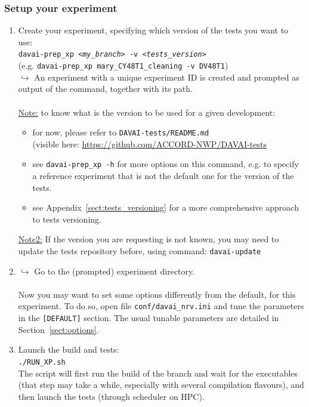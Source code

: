 \documentclass[a4paper,10pt,twoside]{article}
\begin{document}
\subsubsection{Setup your experiment}
\begin{enumerate}[label=(\alph*)]
 \item Create your experiment, specifying which version of the tests you want to use:\\
 \texttt{davai-prep\_xp \textit{<my\_branch>} -v \textit{<tests\_version>}}\\
 (e.g. \texttt{davai-prep\_xp mary\_CY48T1\_cleaning -v DV48T1})\\
 $\hookrightarrow$ An experiment with a unique experiment ID is created and prompted as output of the command, together with its path.\\
 \\
 \underline{Note:} to know what is the version to be used for a given development:
 \begin{itemize}
  \item for now, please refer to \texttt{DAVAI-tests/README.md}\\
        (visible here: \href{https://github.com/ACCORD-NWP/DAVAI-tests}{https://github.com/ACCORD-NWP/DAVAI-tests}
  \item see \texttt{davai-prep\_xp -h} for more options on this command, e.g. to specify a reference experiment that is not the default one for the version of the tests.
  \item see Appendix~\ref{sect:tests_versioning} for a more comprehensive approach to tests versioning.
 \end{itemize}
 \underline{Note2:} If the version you are requesting is not known, you may need to update the tests repository before, using command: \texttt{davai-update}
 \item $\hookrightarrow$ Go to the (prompted) experiment directory.\\
 \\
 Now you may want to set some options differently from the default, for this experiment. To do so, open file \texttt{conf/davai\_nrv.ini} and tune the parameters in the \texttt{[DEFAULT]} section. The usual tunable parameters are detailed in Section~\ref{sect:options}.
 \item Launch the build and tests:\\
 \texttt{./RUN\_XP.sh}\\
 The script will first run the build of the branch and wait for the executables (that step may take a while, especially with several compilation flavours), and then launch the tests (through scheduler on HPC).
\end{enumerate}
\end{document}
